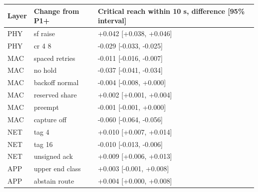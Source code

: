 \begin{tabular}{lll}
\hline
Layer & Change from P1+ & Critical reach within 10 s, difference [95\% interval] \\
\hline
PHY & sf raise & +0.042 [+0.038, +0.046] \\
PHY & cr 4 8 & -0.029 [-0.033, -0.025] \\
MAC & spaced retries & -0.011 [-0.016, -0.007] \\
MAC & no hold & -0.037 [-0.041, -0.034] \\
MAC & backoff normal & -0.004 [-0.008, +0.000] \\
MAC & reserved share & +0.002 [+0.001, +0.004] \\
MAC & preempt & -0.001 [-0.001, +0.000] \\
MAC & capture off & -0.060 [-0.064, -0.056] \\
NET & tag 4 & +0.010 [+0.007, +0.014] \\
NET & tag 16 & -0.010 [-0.013, -0.006] \\
NET & unsigned ack & +0.009 [+0.006, +0.013] \\
APP & upper end class & +0.003 [-0.001, +0.008] \\
APP & abstain route & +0.004 [+0.000, +0.008] \\
\hline
\end{tabular}
